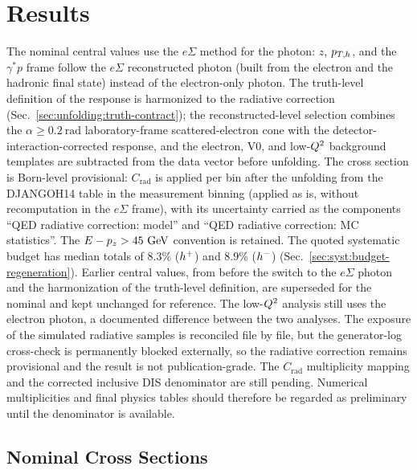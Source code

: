 \section{Results}
\label{sec:results}

\begin{tcolorbox}[colback=yellow!8,colframe=orange!70,title={\bfseries Current status of the measurement}]
The nominal central values use the $e\Sigma$ method for the photon: $z$, $p_{T,h}$,
and the $\gamma^{*}p$ frame follow the $e\Sigma$ reconstructed photon (built
from the electron and the hadronic final state) instead of the electron-only
photon.  The truth-level definition of the response is harmonized
to the radiative correction (Sec.~\ref{sec:unfolding:truth-contract}); the
reconstructed-level selection combines the $\alpha\ge0.2~\mathrm{rad}$
laboratory-frame scattered-electron cone with the
detector-interaction-corrected response, and the electron, V0, and
low-$Q^{2}$ background templates are subtracted from the data vector before
unfolding.  The cross section is Born-level provisional:
$C_{\mathrm{rad}}$ is applied per bin after the unfolding from the DJANGOH14 table
in the measurement binning (applied as is, without recomputation in the $e\Sigma$ frame), with its uncertainty carried as the components
``QED radiative correction: model'' and ``QED radiative correction: MC statistics''.  The
$E-p_z>45~\text{GeV}$ convention is retained.  The quoted systematic budget has median
totals of $8.3\%$ ($h^{+}$) and $8.9\%$ ($h^{-}$)
(Sec.~\ref{sec:syst:budget-regeneration}).  Earlier central values, from before the switch to the $e\Sigma$ photon and the
harmonization of the truth-level definition, are
superseded for the nominal and kept unchanged for reference.  The low-$Q^{2}$ analysis
still uses the electron photon, a documented difference between the two
analyses.  The exposure of the simulated
radiative samples is reconciled file by file, but the generator-log
cross-check is permanently blocked externally, so the radiative correction
remains provisional and the result is not publication-grade.  The
$C_{\mathrm{rad}}$ multiplicity mapping and the
corrected inclusive DIS denominator are still pending.  Numerical
multiplicities and final physics tables should therefore be regarded as
preliminary until the denominator is available.
\end{tcolorbox}

\subsection{Nominal Cross Sections}
\label{sec:results:z005-release}

